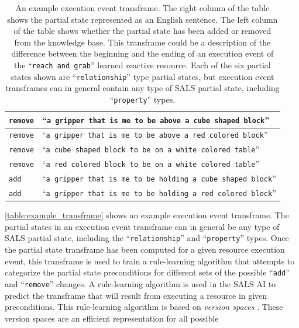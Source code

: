 \begin{table}
\centering
\begin{tabular}{|p{1.5cm}|p{9.5cm}|}
\hline
{\tt{remove}} &``{\tt{a gripper that is me to be above a cube shaped block}}'' \\
\hline
{\tt{remove}} &``{\tt{a gripper that is me to be above a red colored block}}'' \\
\hline
{\tt{remove}} &``{\tt{a cube shaped block to be on a white colored table}}'' \\
\hline
{\tt{remove}} &``{\tt{a red colored block to be on a white colored table}}'' \\
\hline
{\tt{add}}    &``{\tt{a gripper that is me to be holding a cube shaped block}}'' \\
\hline
{\tt{add}}    &``{\tt{a gripper that is me to be holding a red colored block}}'' \\
\hline
\end{tabular}
\caption[An example execution event transframe.]{An example execution
  event transframe.  The right column of the table shows the partial
  state represented as an English sentence.  The left column of the
  table shows whether the partial state has been added or removed from
  the knowledge base.  This transframe could be a description of the
  difference between the beginning and the ending of an execution
  event of the ``{\tt{reach and grab}}'' learned reactive resource.
  Each of the six partial states shown are ``{\tt{relationship}}''
  type partial states, but execution event transframes can in general
  contain any type of SALS partial state, including
  ``{\tt{property}}'' types.}
\label{table:example_transframe}
\end{table}
{\mbox{\autoref{table:example_transframe}}} shows an example execution
event transframe.  The partial states in an execution event transframe
can in general be any type of SALS partial state, including the
``{\tt{relationship}}'' and ``{\tt{property}}'' types.  Once the
partial state transframe has been computed for a given resource
execution event, this transframe is used to train a rule-learning
algorithm that attempts to categorize the partial state preconditions
for different sets of the possible ``{\tt{add}}'' and
``{\tt{remove}}'' changes.  A rule-learning algorithm is used in the
SALS AI to predict the transframe that will result from executing a
resource in given preconditions.  This rule-learning algorithm is
based on {\emph{version spaces}} \cite[]{mitchell:1997}.  These
version spaces are an efficient representation for all possible
